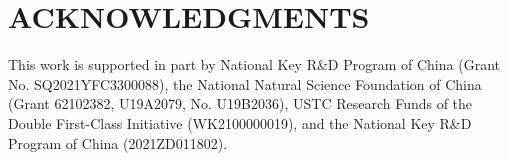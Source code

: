 \section{ACKNOWLEDGMENTS}
This work is supported in part by National Key R\&D Program of China (Grant No. SQ2021YFC3300088), the National Natural Science Foundation
of China (Grant 62102382, U19A2079, No. U19B2036),  USTC Research
Funds of the Double First-Class Initiative (WK2100000019), and the National Key R\&D Program of China (2021ZD011802).